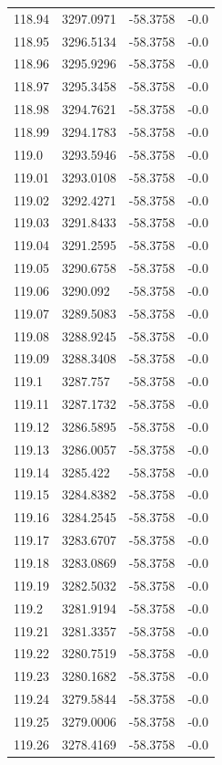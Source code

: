 \begin{table}[H]
\begin{tabular}{llll}
118.94 & 3297.0971 & -58.3758 & -0.0 \\
118.95 & 3296.5134 & -58.3758 & -0.0 \\
118.96 & 3295.9296 & -58.3758 & -0.0 \\
118.97 & 3295.3458 & -58.3758 & -0.0 \\
118.98 & 3294.7621 & -58.3758 & -0.0 \\
118.99 & 3294.1783 & -58.3758 & -0.0 \\
119.0 & 3293.5946 & -58.3758 & -0.0 \\
119.01 & 3293.0108 & -58.3758 & -0.0 \\
119.02 & 3292.4271 & -58.3758 & -0.0 \\
119.03 & 3291.8433 & -58.3758 & -0.0 \\
119.04 & 3291.2595 & -58.3758 & -0.0 \\
119.05 & 3290.6758 & -58.3758 & -0.0 \\
119.06 & 3290.092 & -58.3758 & -0.0 \\
119.07 & 3289.5083 & -58.3758 & -0.0 \\
119.08 & 3288.9245 & -58.3758 & -0.0 \\
119.09 & 3288.3408 & -58.3758 & -0.0 \\
119.1 & 3287.757 & -58.3758 & -0.0 \\
119.11 & 3287.1732 & -58.3758 & -0.0 \\
119.12 & 3286.5895 & -58.3758 & -0.0 \\
119.13 & 3286.0057 & -58.3758 & -0.0 \\
119.14 & 3285.422 & -58.3758 & -0.0 \\
119.15 & 3284.8382 & -58.3758 & -0.0 \\
119.16 & 3284.2545 & -58.3758 & -0.0 \\
119.17 & 3283.6707 & -58.3758 & -0.0 \\
119.18 & 3283.0869 & -58.3758 & -0.0 \\
119.19 & 3282.5032 & -58.3758 & -0.0 \\
119.2 & 3281.9194 & -58.3758 & -0.0 \\
119.21 & 3281.3357 & -58.3758 & -0.0 \\
119.22 & 3280.7519 & -58.3758 & -0.0 \\
119.23 & 3280.1682 & -58.3758 & -0.0 \\
119.24 & 3279.5844 & -58.3758 & -0.0 \\
119.25 & 3279.0006 & -58.3758 & -0.0 \\
119.26 & 3278.4169 & -58.3758 & -0.0 \\

\end{tabular}
\end{table}
